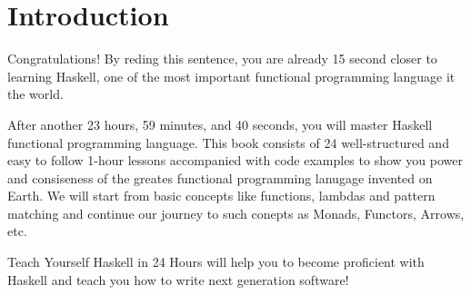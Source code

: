\chapter*{Introduction}

Congratulations! By reding this sentence, you are already 15 second closer to
learning Haskell, one of the most important functional programming language it
the world.

After another 23 hours, 59 minutes, and 40 seconds, you will master Haskell
functional programming language. This book consists of 24 well-structured
and easy to follow 1-hour lessons accompanied with code examples to show
you power and consiseness of the greates functional programming lanugage
invented on Earth. We will start from basic concepts like functions, lambdas
and pattern matching and continue our journey to such conepts as Monads,
Functors, Arrows, etc.

Teach Yourself Haskell in 24 Hours will help you to become proficient
with Haskell and teach you how to write next generation software!